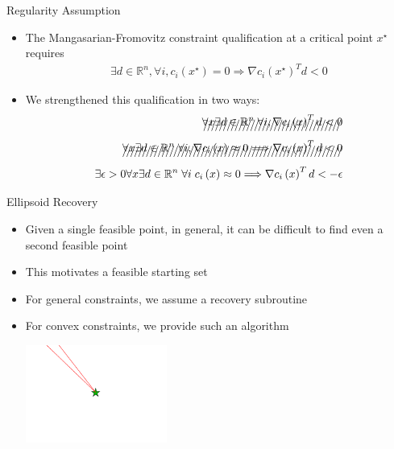 \documentclass{beamer}
\newcommand{\Rn}{\mathbb R ^ {n}}
\begin{document}
\begin{frame}{Regularity Assumption}
\begin{itemize}
\item The Mangasarian-Fromovitz constraint qualification at a critical point $x^{\star}$ requires
\begin{align*}
\exists d \in \Rn, \forall i, c_i\left(x^{\star}\right)=0 \Longrightarrow \nabla c_i\left(x^{\star}\right)^T d < 0 
\end{align*}
\item We strengthened this qualification in two ways:
\begin{align*}
\xout{\forall x \exists d \in \Rn\; \forall i, \nabla c_i\left(x\right)^T d < 0} \\
\xout{\forall x \exists d \in \Rn\; \forall i, \nabla c_i\left(x\right) \approx 0 \Longrightarrow \nabla c_i\left(x\right)^T d < 0} \\
\exists \epsilon>0 \forall x\exists d\in \Rn\; \forall i\; c_i\left(x\right) \approx 0
\Longrightarrow \nabla c_i\left(x\right)^T d < -\epsilon \\
\end{align*}
\end{itemize}
\end{frame}



\begin{frame}{Ellipsoid Recovery}
\begin{itemize}
	\item Given a single feasible point, in general, it can be difficult to find even a second feasible point
	\item This motivates a feasible starting set
	\item For general constraints, we assume a recovery subroutine
	\item For convex constraints, we provide such an algorithm
	\begin{center}
		\includegraphics[width=175px]{images/only_one_feasible_point.png}
	\end{center}
\end{itemize}
\end{frame}
\end{document}

